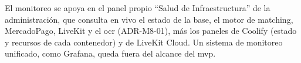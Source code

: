 El monitoreo se apoya en el panel propio ``Salud de Infraestructura''
de la administración, que consulta en vivo el estado de la base, el motor
de \gls{matching}, MercadoPago, LiveKit y el \gls{ocr} (ADR-M8-01), más los
paneles de Coolify (estado y recursos de cada contenedor) y de LiveKit
Cloud. Un sistema de monitoreo unificado, como Grafana, queda fuera del
alcance del \gls{mvp}.
